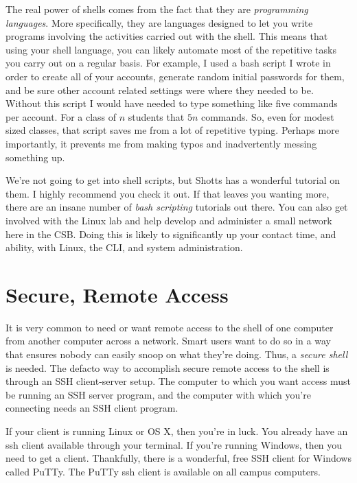 \documentclass[nobib]{tufte-handout}
\begin{document}
The real power of shells comes from the fact that they are \textit{programming languages}.  More specifically, they are languages designed to let you write programs involving the activities carried out with the shell.  This means that using your shell language, you can likely automate most of the repetitive tasks you carry out on a regular basis.  For example, I used a bash script I wrote in order to create all of your accounts, generate random initial passwords for them, and be sure other account related settings were where they needed to be.  Without this script I would have needed to type something like five commands per account. For a class of $n$ students that $5n$ commands.  So, even for modest sized classes, that script saves me from a lot of repetitive typing. Perhaps more importantly, it prevents me from making typos and inadvertently messing something up.

We're not going to get into shell scripts, but Shotts has a wonderful tutorial on them. I highly recommend you check it out.  If that leaves you wanting more, there are an insane number of \textit{bash scripting} tutorials out there.  You can also get involved with the Linux lab and help develop and administer a small network here in the CSB\@.  Doing this is likely to significantly up your contact time, and ability, with Linux, the CLI, and system administration.

\section{Secure, Remote Access}

It is very common to need or want remote access to the shell of one computer from another computer across a network. Smart users want to do so in a way that ensures nobody can easily snoop on what they're doing. Thus, a \textit{secure shell} is needed. The defacto way to accomplish secure remote access to the shell is through an SSH client-server setup.  The computer to which you want access must be running an SSH server program, and the computer with which you're connecting needs an SSH client program.

If your client is running Linux or OS X, then you're in luck. You already have an ssh client available through your terminal.  If you're running Windows, then you need to get a client. Thankfully, there is a wonderful, free SSH client for Windows called PuTTy.  The PuTTy ssh client is available on all campus computers.
\end{document}
